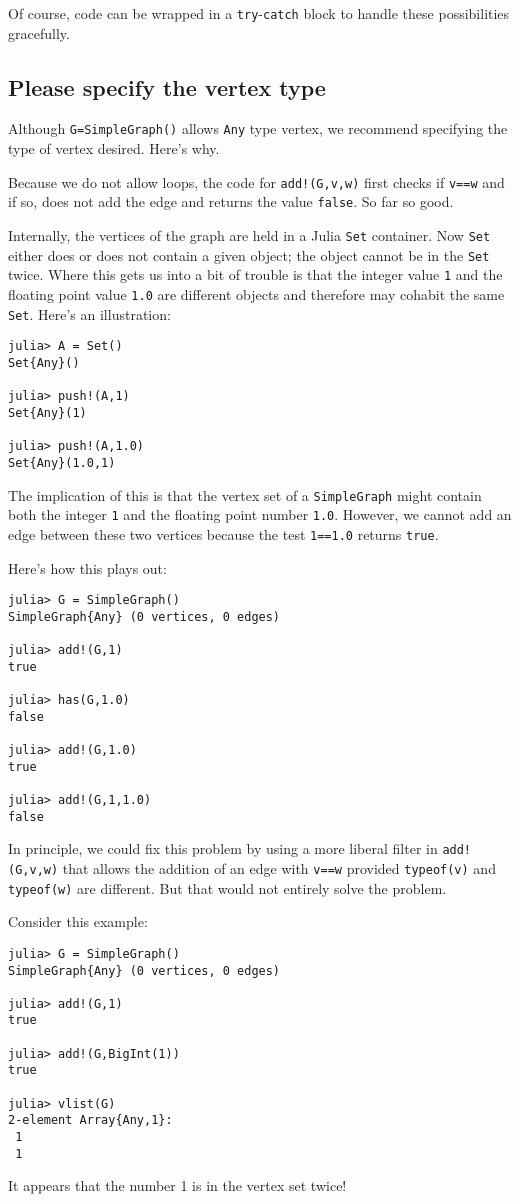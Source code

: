 \documentclass[oneside]{amsart}
\begin{document}
Of course, code can be wrapped in a \verb|try|-\verb|catch| block to
handle these possibilities gracefully.


\subsection*{Please specify the vertex type}
Although \verb|G=SimpleGraph()| allows \verb|Any| type vertex, we
recommend specifying the type of vertex desired. Here's why.

Because we do not allow loops, the code for \verb|add!(G,v,w)| first
checks if \verb|v==w| and if so, does not add the edge and returns the
value \verb|false|. So far so good.

Internally, the vertices of the graph are held in a Julia \verb|Set|
container. Now \verb|Set| either does or does not contain a given
object; the object cannot be in the \verb|Set| twice. Where this gets
us into a bit of trouble is that the integer value \verb|1| and the
floating point value \verb|1.0| are different objects and therefore
may cohabit the same \verb|Set|. Here's an illustration:
\begin{verbatim}
julia> A = Set()
Set{Any}()

julia> push!(A,1)
Set{Any}(1)

julia> push!(A,1.0)
Set{Any}(1.0,1)
\end{verbatim}
The implication of this is that the vertex set of a \verb|SimpleGraph|
might contain both the integer \verb|1| and the floating point number
\verb|1.0|. However, we cannot add an edge between these two vertices
because the test \verb|1==1.0| returns \verb|true|.

Here's how this plays out:
\begin{verbatim}
julia> G = SimpleGraph()
SimpleGraph{Any} (0 vertices, 0 edges)

julia> add!(G,1)
true

julia> has(G,1.0)
false

julia> add!(G,1.0)
true

julia> add!(G,1,1.0)
false
\end{verbatim}

In principle, we could fix this problem by using a more liberal filter
in \verb|add!(G,v,w)| that allows the addition of an edge with
\verb|v==w| provided \verb|typeof(v)| and \verb|typeof(w)| are
different. But that would not entirely solve the problem.

Consider this example:
\begin{verbatim}
julia> G = SimpleGraph()
SimpleGraph{Any} (0 vertices, 0 edges)

julia> add!(G,1)
true

julia> add!(G,BigInt(1))
true

julia> vlist(G)
2-element Array{Any,1}:
 1
 1
\end{verbatim}
It appears that the number 1 is in the vertex set twice!
\end{document}
